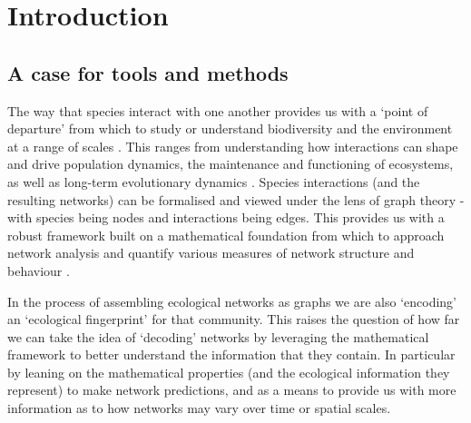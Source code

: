 \anglais
\doublespacing
\chapter*{Introduction}

\section{A case for tools and methods}

The way that species interact with one another provides us with a `point of
departure' from which to study or understand biodiversity and the
environment at a range of scales \cite{Jordano2016ChaEco}. This ranges from
understanding how interactions can shape and drive population dynamics,
the maintenance and functioning of ecosystems, as well as long-term
evolutionary dynamics \cite{Landi2018ComSta, Albrecht2018PlaAni}.
Species interactions (and the resulting networks) can be formalised
and viewed under the lens of graph theory \cite{Dale2010GraSpa} - with
species being nodes and interactions being edges. This provides us with
a robust framework built on a mathematical foundation from which to approach
network analysis and quantify various measures of network structure and
behaviour \cite{Delmas2019AnaEco}.

In the process of assembling ecological networks as graphs we are also
`encoding' an `ecological fingerprint' for that community. This raises
the question of how far we can take the idea of `decoding' networks
by leveraging the mathematical framework to better understand the
information that they contain. In particular by leaning on the
mathematical properties (and the ecological information they represent)
to make network predictions, and as a means to provide us with more
information as to how networks may vary over time or spatial scales.


